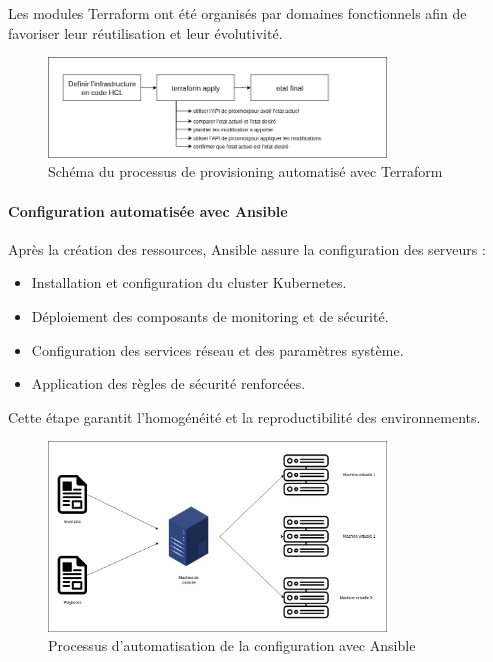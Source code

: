 Les modules Terraform ont été organisés par domaines fonctionnels afin de favoriser leur réutilisation et leur évolutivité.

\begin{figure}[H]
	\centering
	\includegraphics[width=0.8\textwidth]{figures/terraform-provisioning.png}
	\caption{Schéma du processus de provisioning automatisé avec Terraform}
\end{figure}

\paragraph{\textbf{Configuration automatisée avec Ansible}}

Après la création des ressources, Ansible assure la configuration des serveurs :
\begin{itemize}
	\item Installation et configuration du cluster Kubernetes.
	\item Déploiement des composants de monitoring et de sécurité.
	\item Configuration des services réseau et des paramètres système.
	\item Application des règles de sécurité renforcées.
\end{itemize}

Cette étape garantit l’homogénéité et la reproductibilité des environnements.

\begin{figure}[H]
	\centering
	\includegraphics[width=0.8\textwidth]{figures/ansible-configuration.png}
	\caption{Processus d'automatisation de la configuration avec Ansible}
\end{figure}

